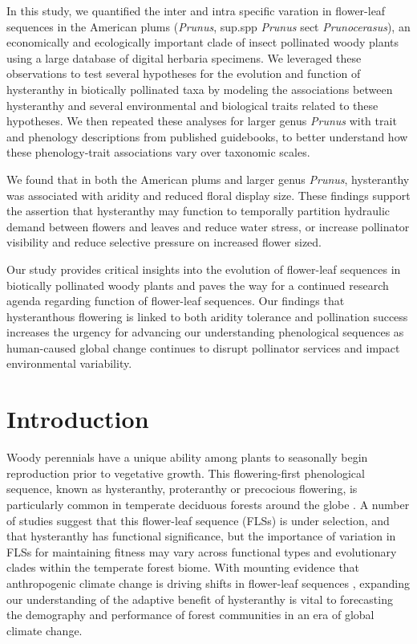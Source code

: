 \documentclass{article}[11pt]
\begin{document}
In this study, we quantified the inter and intra specific varation in flower-leaf sequences in the American plums (\emph{Prunus}, sup.spp \emph{Prunus} sect \emph{Prunocerasus}), an economically and ecologically important clade of insect pollinated woody plants using a large database of digital herbaria specimens. We leveraged these observations to test several hypotheses for the evolution and function of hysteranthy in biotically pollinated taxa by modeling the associations between hysteranthy and several environmental and biological traits related to these hypotheses. We then repeated these analyses for larger genus \emph{Prunus} with trait and phenology descriptions from published guidebooks, to better understand how these phenology-trait associations vary over taxonomic scales.

We found that in both the American plums and larger genus \emph{Prunus}, hysteranthy was associated with aridity and reduced floral display size. These findings support the assertion that hysteranthy may function to temporally partition hydraulic demand between flowers and leaves and reduce water stress, or increase pollinator visibility and reduce selective pressure on increased flower sized.

Our study provides critical insights into the evolution of flower-leaf sequences in biotically pollinated woody plants and paves the way for a continued research agenda regarding function of flower-leaf sequences. Our findings that hysteranthous flowering is linked to both aridity tolerance and pollination success increases the urgency for advancing our understanding phenological sequences as human-caused global change continues to disrupt pollinator services and impact environmental variability. 


\section*{Introduction}
\noindent Woody perennials have a unique ability among plants to seasonally begin reproduction prior to vegetative growth. This flowering-first phenological sequence, known as hysteranthy, proteranthy or precocious flowering, is particularly common in temperate deciduous forests around the globe \citep{Rathcke_1985}. A number of studies suggest that this flower-leaf sequence (FLSs) is under selection, and that hysteranthy has functional significance, but the importance of variation in FLSs for maintaining fitness \citep{Gougherty2018,Buonaiuto2020,Guo2014} may vary across functional types and evolutionary clades within the temperate forest biome. With mounting evidence that anthropogenic climate change is driving shifts in flower-leaf sequences \citep{Ma2020:aa}, expanding our understanding of the adaptive benefit of hysteranthy is vital to forecasting the demography and performance of forest communities in an era of global climate change.
\end{document}
